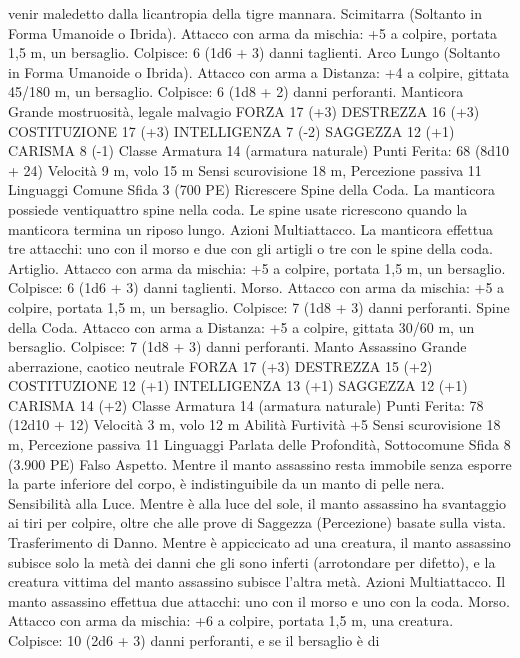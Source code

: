 \begin{multicols}{2}
venir maledetto dalla licantropia della tigre mannara.
Scimitarra (Soltanto in Forma Umanoide o Ibrida). Attacco
con arma da mischia: +5 a colpire, portata 1,5 m, un bersaglio.
Colpisce: 6 (1d6 + 3) danni taglienti.
Arco Lungo (Soltanto in Forma Umanoide o Ibrida). Attacco
con arma a Distanza: +4 a colpire, gittata 45/180 m, un
bersaglio.
Colpisce: 6 (1d8 + 2) danni perforanti.
Manticora
Grande mostruosità, legale malvagio
FORZA 17 (+3)
DESTREZZA 16 (+3)
COSTITUZIONE 17 (+3)
INTELLIGENZA 7 (-2)
SAGGEZZA 12 (+1)
CARISMA 8 (-1)
Classe Armatura 14 (armatura naturale)
\hspace*{0pt}\hfill{Punti Ferita}: 68 (8d10 + 24)
Velocità 9 m, volo 15 m
Sensi scurovisione 18 m, Percezione passiva 11
Linguaggi Comune
Sfida 3 (700 PE)
Ricrescere Spine della Coda. La manticora possiede ventiquattro
spine nella coda. Le spine usate ricrescono quando la manticora
termina un riposo lungo.
Azioni
Multiattacco. La manticora effettua tre attacchi: uno con il
morso e due con gli artigli o tre con le spine della coda.
Artiglio. Attacco con arma da mischia: +5 a colpire, portata 1,5
m, un bersaglio.
Colpisce: 6 (1d6 + 3) danni taglienti.
Morso. Attacco con arma da mischia: +5 a colpire, portata 1,5
m, un bersaglio.
Colpisce: 7 (1d8 + 3) danni perforanti.
Spine della Coda. Attacco con arma a Distanza: +5 a colpire,
gittata 30/60 m, un bersaglio.
Colpisce: 7 (1d8 + 3) danni perforanti.
Manto Assassino
Grande aberrazione, caotico neutrale
FORZA 17 (+3)
DESTREZZA 15 (+2)
COSTITUZIONE 12 (+1)
INTELLIGENZA 13 (+1)
SAGGEZZA 12 (+1)
CARISMA 14 (+2)
Classe Armatura 14 (armatura naturale)
\hspace*{0pt}\hfill{Punti Ferita}: 78 (12d10 + 12)
Velocità 3 m, volo 12 m
Abilità Furtività +5
Sensi scurovisione 18 m, Percezione passiva 11
Linguaggi Parlata delle Profondità, Sottocomune
Sfida 8 (3.900 PE)
Falso Aspetto. Mentre il manto assassino resta immobile senza
esporre la parte inferiore del corpo, è indistinguibile da un manto
di pelle nera.
Sensibilità alla Luce. Mentre è alla luce del sole, il manto
assassino ha svantaggio ai tiri per colpire, oltre che alle prove di
Saggezza (Percezione) basate sulla vista.
Trasferimento di Danno. Mentre è appiccicato ad una creatura,
il manto assassino subisce solo la metà dei danni che gli sono
inferti (arrotondare per difetto), e la creatura vittima del manto
assassino subisce l’altra metà.
Azioni
Multiattacco. Il manto assassino effettua due attacchi: uno con il
morso e uno con la coda.
Morso. Attacco con arma da mischia: +6 a colpire, portata 1,5
m, una creatura.
Colpisce: 10 (2d6 + 3) danni perforanti, e se il bersaglio è di

\end{multicols}
